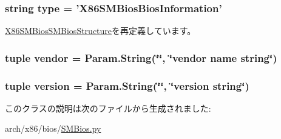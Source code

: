 \label{classSMBios_1_1X86SMBiosBiosInformation_abb971818cdd9c898cb5e830ed787abd6}
\hypertarget{classSMBios_1_1X86SMBiosBiosInformation_acce15679d830831b0bbe8ebc2a60b2ca}{
\subsubsection[{type}]{\setlength{\rightskip}{0pt plus 5cm}string {\bf type} = '{\bf X86SMBiosBiosInformation}'}}
\label{classSMBios_1_1X86SMBiosBiosInformation_acce15679d830831b0bbe8ebc2a60b2ca}


\hyperlink{classSMBios_1_1X86SMBiosSMBiosStructure_acce15679d830831b0bbe8ebc2a60b2ca}{X86SMBiosSMBiosStructure}を再定義しています。\hypertarget{classSMBios_1_1X86SMBiosBiosInformation_af18d8b19bc59dc637e09c47787f115a8}{
\subsubsection[{vendor}]{\setlength{\rightskip}{0pt plus 5cm}tuple {\bf vendor} = Param.String(\char`\"{}\char`\"{}, \char`\"{}vendor name string\char`\"{})}}
\label{classSMBios_1_1X86SMBiosBiosInformation_af18d8b19bc59dc637e09c47787f115a8}
\hypertarget{classSMBios_1_1X86SMBiosBiosInformation_a76aa01cd80eeb03b381ebe36f17c16b2}{
\subsubsection[{version}]{\setlength{\rightskip}{0pt plus 5cm}tuple {\bf version} = Param.String(\char`\"{}\char`\"{}, \char`\"{}version string\char`\"{})}}
\label{classSMBios_1_1X86SMBiosBiosInformation_a76aa01cd80eeb03b381ebe36f17c16b2}


このクラスの説明は次のファイルから生成されました:\begin{DoxyCompactItemize}
\item 
arch/x86/bios/\hyperlink{SMBios_8py}{SMBios.py}\end{DoxyCompactItemize}
